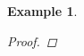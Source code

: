 \documentclass[a4paper, 10pt, final]{article}
\newtheorem{example}{Example}[section]
\begin{document}
\begin{example}
\begin{proof}










\end{proof}
\end{example}
\end{document}
